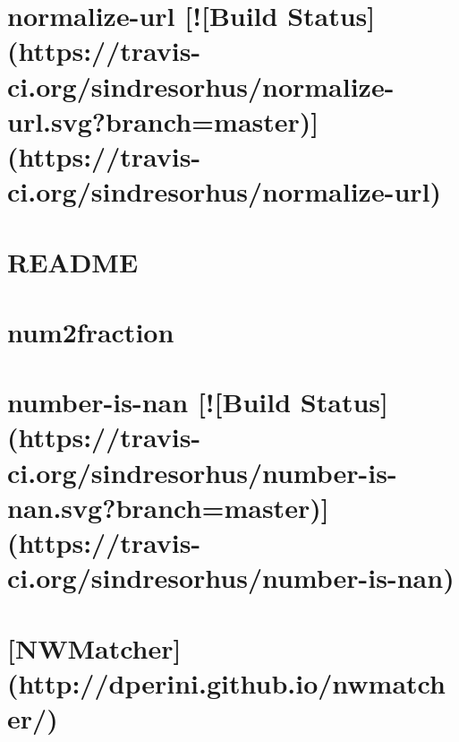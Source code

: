 \documentclass[twoside]{book}
\newcommand{\+}{\discretionary{\mbox{\scriptsize$\hookleftarrow$}}{}{}}
\begin{document}
\chapter{normalize-\/url \mbox{[}!\mbox{[}Build Status\mbox{]}(https\+://travis-\/ci.org/sindresorhus/normalize-\/url.svg?branch=master)\mbox{]}(https\+://travis-\/ci.org/sindresorhus/normalize-\/url)}
\label{md__c_1_workspace_demo_src_main_script_node_modules_normalize-url_readme}

\chapter{R\+E\+A\+D\+ME}
\label{md__c_1_workspace_demo_src_main_script_node_modules_nth-check__r_e_a_d_m_e}

\chapter{num2fraction}
\label{md__c_1_workspace_demo_src_main_script_node_modules_num2fraction__r_e_a_d_m_e}

\chapter{number-\/is-\/nan \mbox{[}!\mbox{[}Build Status\mbox{]}(https\+://travis-\/ci.org/sindresorhus/number-\/is-\/nan.svg?branch=master)\mbox{]}(https\+://travis-\/ci.org/sindresorhus/number-\/is-\/nan)}
\label{md__c_1_workspace_demo_src_main_script_node_modules_number-is-nan_readme}

\chapter{\mbox{[}N\+W\+Matcher\mbox{]}(http\+://dperini.github.\+io/nwmatcher/)}
\label{md__c_1_workspace_demo_src_main_script_node_modules_nwmatcher__r_e_a_d_m_e}

\end{document}
